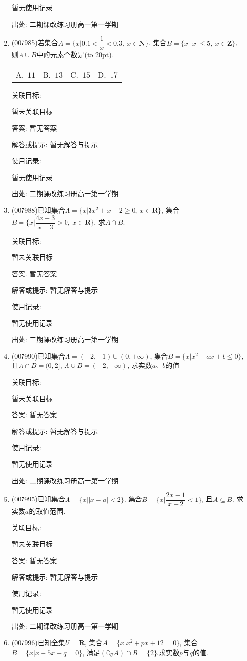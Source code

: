 \documentclass[10pt,a4paper]{article}
\newcommand{\bracket}[1]{(\hbox to #1pt{})}
\newcommand{\fourch}[4]{\par\begin{tabular}{p{.23\textwidth}p{.23\textwidth}p{.23\textwidth}p{.23\textwidth}}
A.~#1 &B.~#2& C.~#3& D.~#4
\end{tabular}}
\begin{document}
\begin{enumerate}[1.]
暂无使用记录


出处: 二期课改练习册高一第一学期
\item { (007985)}若集合$A=\{x|0.1<\dfrac 1x<0.3,\ x\in \mathbf{N}\}$, 集合$B=\{x||x|\le 5,\ x\in \mathbf{Z}\}$, 则$A\cup B$中的元素个数是\bracket{20}.
\fourch{$11$}{$13$}{$15$}{$17$}


关联目标:

暂未关联目标

答案: 暂无答案

解答或提示: 暂无解答与提示

使用记录:

暂无使用记录


出处: 二期课改练习册高一第一学期
\item { (007988)}已知集合$A=\{x|3x^2+x-2\ge 0,\  x\in \mathbf{R}\}$, 集合$B=\{x|\dfrac{4x-3}{x-3}>0,\ x\in \mathbf{R}\}$, 求$A\cap B$.


关联目标:

暂未关联目标

答案: 暂无答案

解答或提示: 暂无解答与提示

使用记录:

暂无使用记录


出处: 二期课改练习册高一第一学期
\item { (007990)}已知集合$A=(-2,-1)\cup (0,+\infty)$, 集合$B=\{x|x^2+ax+b\le 0\}$, 且$A\cap B=(0,2]$, $A\cup B=(-2,+\infty)$, 求实数$a$、$b$的值.


关联目标:

暂未关联目标

答案: 暂无答案

解答或提示: 暂无解答与提示

使用记录:

暂无使用记录


出处: 二期课改练习册高一第一学期
\item { (007995)}已知集合$A=\{x||x-a|<2\}$, 集合$B=\{x|\dfrac{2x-1}{x-2}<1\}$, 且$A\subseteq B$, 求实数$a$的取值范围.


关联目标:

暂未关联目标

答案: 暂无答案

解答或提示: 暂无解答与提示

使用记录:

暂无使用记录


出处: 二期课改练习册高一第一学期
\item { (007996)}已知全集$U=\mathbf{R}$, 集合$A=\{x|x^2+px+12=0\}$, 集合$B=\{x|x-5x-q=0\}$, 满足$(\complement _UA)\cap B=\{2\}$.求实数$p$与$q$的值.



\end{enumerate}
\end{document}
